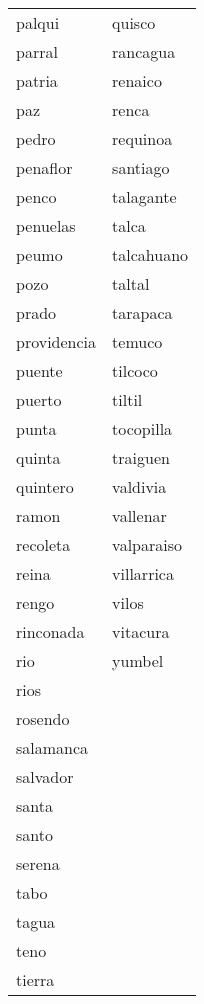 \begin{longtable}{l|l}
             palqui   &  quisco   \\  
             parral   &  rancagua   \\  
             patria   &  renaico   \\  
             paz   &  renca   \\  
             pedro   &  requinoa   \\  
             penaflor   &  santiago   \\  
             penco   &  talagante   \\  
             penuelas   &  talca   \\  
             peumo   &  talcahuano   \\  
             pozo   &  taltal   \\  
             prado   &  tarapaca   \\  
             providencia   &  temuco   \\  
             puente   &  tilcoco   \\  
             puerto   &  tiltil   \\  
             punta   &  tocopilla   \\  
             quinta   &  traiguen   \\  
             quintero   &  valdivia   \\  
             ramon   &  vallenar   \\  
             recoleta   &  valparaiso   \\  
             reina   &  villarrica   \\  
             rengo   &  vilos   \\  
             rinconada   &  vitacura   \\  
             rio   & yumbel \\  
             rios   & ~ \\  
             rosendo   & ~ \\  
             salamanca   & ~ \\  
             salvador   & ~ \\  
             santa   & ~ \\  
             santo   & ~ \\  
             serena   & ~ \\  
             tabo   & ~ \\  
             tagua   & ~ \\  
             teno   & ~ \\  
             tierra   & ~ \\  

\end{longtable}

